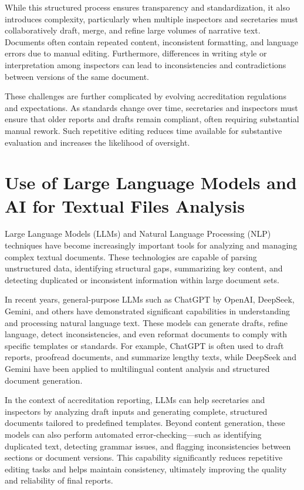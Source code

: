 While this structured process ensures transparency and standardization, it also introduces complexity, particularly when multiple inspectors and secretaries must collaboratively draft, merge, and refine large volumes of narrative text. Documents often contain repeated content, inconsistent formatting, and language errors due to manual editing. Furthermore, differences in writing style or interpretation among inspectors can lead to inconsistencies and contradictions between versions of the same document.

These challenges are further complicated by evolving accreditation regulations and expectations. As standards change over time, secretaries and inspectors must ensure that older reports and drafts remain compliant, often requiring substantial manual rework. Such repetitive editing reduces time available for substantive evaluation and increases the likelihood of oversight.


\section{Use of Large Language Models and AI for Textual Files Analysis}

Large Language Models (LLMs) and Natural Language Processing (NLP) techniques have become increasingly important tools for analyzing and managing complex textual documents. These technologies are capable of parsing unstructured data, identifying structural gaps, summarizing key content, and detecting duplicated or inconsistent information within large document sets.

In recent years, general-purpose LLMs such as ChatGPT by OpenAI, DeepSeek, Gemini, and others have demonstrated significant capabilities in understanding and processing natural language text. These models can generate drafts, refine language, detect inconsistencies, and even reformat documents to comply with specific templates or standards. For example, ChatGPT is often used to draft reports, proofread documents, and summarize lengthy texts, while DeepSeek and Gemini have been applied to multilingual content analysis and structured document generation.

In the context of accreditation reporting, LLMs can help secretaries and inspectors by analyzing draft inputs and generating complete, structured documents tailored to predefined templates. Beyond content generation, these models can also perform automated error-checking—such as identifying duplicated text, detecting grammar issues, and flagging inconsistencies between sections or document versions. This capability significantly reduces repetitive editing tasks and helps maintain consistency, ultimately improving the quality and reliability of final reports.

